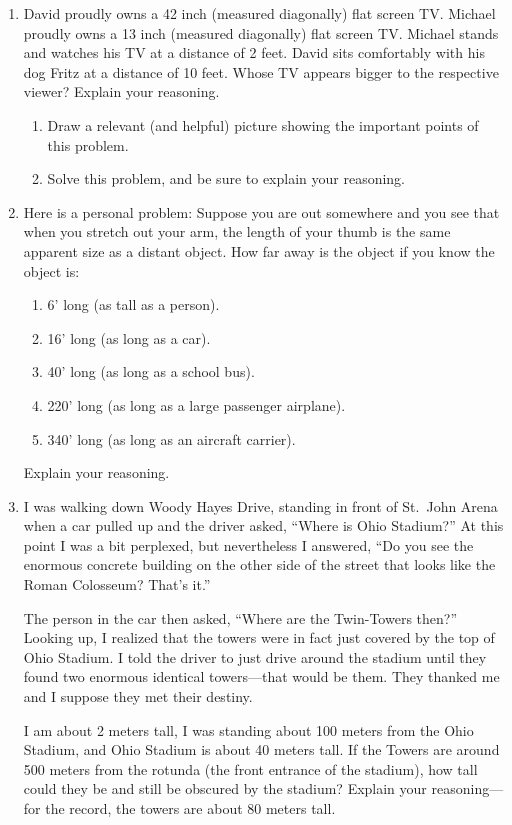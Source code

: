 \begin{enumerate}
\item David proudly owns a 42 inch (measured diagonally) flat screen
  TV. Michael proudly owns a 13 inch (measured diagonally) flat screen
  TV. Michael stands and watches his TV at a distance of 2 feet. David
  sits comfortably with his dog Fritz at a distance of 10 feet. Whose
  TV appears bigger to the respective viewer? Explain your reasoning.
\begin{enumerate}
\item Draw a relevant (and helpful) picture showing the important
  points of this problem.
\item Solve this problem, and be sure to explain your reasoning.
\end{enumerate}

\item Here is a personal problem: Suppose you are out somewhere and
  you see that when you stretch out your arm, the length of your thumb
  is the same apparent size as a distant object. How far away is the
  object if you know the object is:
\begin{enumerate}
\item 6' long (as tall as a person).
\item 16' long (as long as a car).
\item 40' long (as long as a school bus).
\item 220' long (as long as a large passenger airplane).
\item 340' long (as long as an aircraft carrier).
\end{enumerate}
Explain your reasoning.

\item I was walking down Woody Hayes Drive, standing in front of
  St.\ John Arena when a car pulled up and the driver asked, ``Where
  is Ohio Stadium?'' At this point I was a bit perplexed, but
  nevertheless I answered, ``Do you see the enormous concrete building
  on the other side of the street that looks like the Roman Colosseum?
  That's it.''
 
The person in the car then asked, ``Where are the Twin-Towers then?''
Looking up, I realized that the towers were in fact just covered by the
top of Ohio Stadium. I told the driver to just drive around the
stadium until they found two enormous identical towers---that would be
them. They thanked me and I suppose they met their destiny.

I am about 2 meters tall, I was standing about 100 meters from the
Ohio Stadium, and Ohio Stadium is about 40 meters tall. If the Towers
are around 500 meters from the rotunda (the front entrance of the
stadium), how tall could they be and still be obscured by the stadium?
Explain your reasoning---for the record, the towers are about 80
meters tall.



\end{enumerate}
